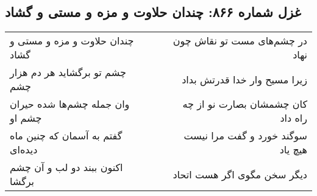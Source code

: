 \begin{center}
\section*{غزل شماره ۸۶۶: چندان حلاوت و مزه و مستی و گشاد}
\label{sec:0866}
\begin{longtable}{l p{0.5cm} r}
چندان حلاوت و مزه و مستی و گشاد
&&
در چشم‌های مست تو نقاش چون نهاد
\\
چشم تو برگشاید هر دم هزار چشم
&&
زیرا مسیح وار خدا قدرتش بداد
\\
وان جمله چشم‌ها شده حیران چشم او
&&
کان چشمشان بصارت نو از چه راه داد
\\
گفتم به آسمان که چنین ماه دیده‌ای
&&
سوگند خورد و گفت مرا نیست هیچ یاد
\\
اکنون ببند دو لب و آن چشم برگشا
&&
دیگر سخن مگوی اگر هست اتحاد
\\
\end{longtable}
\end{center}
